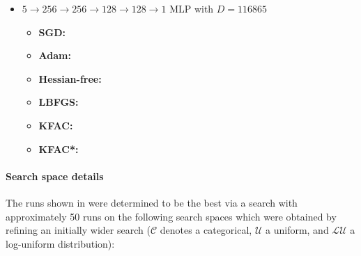 \begin{itemize}
\item $5 \to 256 \to 256\to 128 \to 128 \to 1$ MLP with $D=\num{116865}$
  \begin{itemize}
    \def\pathToRuns{kfac_pinns_exp/exp29_heat4d_big/tex}
  \item \textbf{SGD:} 
  \item \textbf{Adam:} 
  \item \textbf{Hessian-free:} 
  \item \textbf{LBFGS:} 
  \item \textbf{KFAC:} 
  \item \textbf{KFAC*:} 
  \end{itemize}
\end{itemize}

\paragraph{Search space details} The runs shown in  were determined to be the best via a search with approximately 50 runs on the following search spaces which were obtained by refining an initially wider search ($\mathcal{C}$ denotes a categorical, $\mathcal{U}$ a uniform, and $\mathcal{LU}$ a log-uniform distribution):

